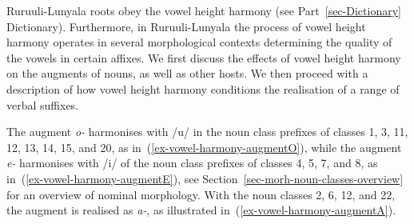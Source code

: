 Ruruuli-Lunyala roots obey the vowel height harmony (see Part~\ref{sec-Dictionary} Dictionary). 
Furthermore, in Ru\-ruu\-li\hyp{}Lu\-nya\-la the process of vowel height harmony operates in several morphological contexts determining the quality of the vowels in certain affixes.  
We first discuss the effects of vowel height harmony on the augments of nouns, as well as other hosts. We then proceed with a description of how vowel height harmony conditions the realisation of a range of verbal suffixes. 

The augment  \textit{o-} harmonises with /u/ in the noun class prefixes of classes 1, 3, 11, 12, 13, 14, 15, and 20, as in~(\ref{ex-vowel-harmony-augmentO}), while the augment  \textit{e-} harmonises with /i/ of the noun class prefixes of classes 4, 5, 7, and 8, as in~(\ref{ex-vowel-harmony-augmentE}), see Section~\ref{sec-morh-noun-classes-overview} for an overview of nominal morphology.
With the noun classes 2, 6, 12, and 22, the augment is realised as  \textit{a-}, as illustrated in~(\ref{ex-vowel-harmony-augmentA}). 

